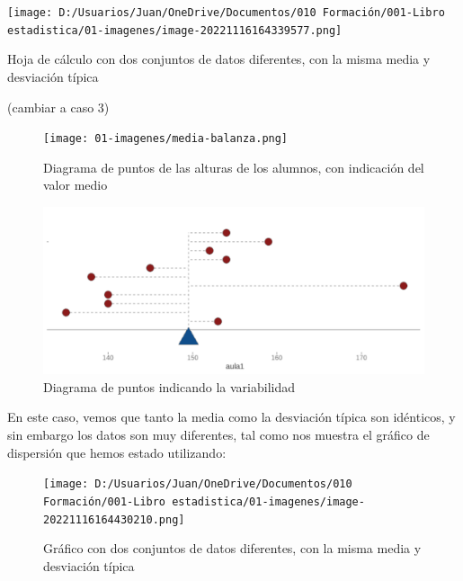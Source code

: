 \documentclass[
  letterpaper,
  DIV=11,
  numbers=noendperiod,
  oneside]{scrreprt}
\begin{document}
\begin{marginfigure}

{\centering \texttt{[image: D:/Usuarios/Juan/OneDrive/Documentos/010 Formación/001-Libro estadistica/01-imagenes/image-20221116164339577.png]}

}

\caption{Hoja de cálculo con dos conjuntos de datos diferentes, con la
misma media y desviación típica}

\end{marginfigure}

(cambiar a caso 3)

\begin{figure}

{\centering \texttt{[image: 01-imagenes/media-balanza.png]}

}

\caption{Diagrama de puntos de las alturas de los alumnos, con
indicación del valor medio}

\end{figure}

\begin{figure}

{\centering \includegraphics{01-imagenes/plot_varianzas.png}

}

\caption{Diagrama de puntos indicando la variabilidad}

\end{figure}

En este caso, vemos que tanto la media como la desviación típica son
idénticos, y sin embargo los datos son muy diferentes, tal como nos
muestra el gráfico de dispersión que hemos estado utilizando:

\begin{figure}

{\centering \texttt{[image: D:/Usuarios/Juan/OneDrive/Documentos/010 Formación/001-Libro estadistica/01-imagenes/image-20221116164430210.png]}

}

\caption{Gráfico con dos conjuntos de datos diferentes, con la misma
media y desviación típica}

\end{figure}
\end{document}
